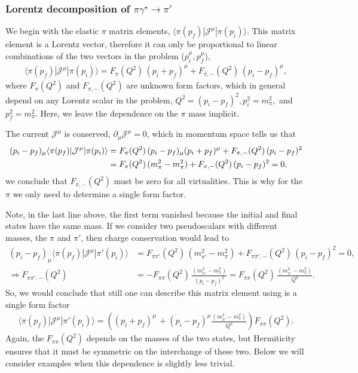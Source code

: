 \subsubsection{Lorentz decomposition of $\pi\gamma^\star\to\pi'$}
We begin with the elastic $\pi$ matrix elements, $\langle\pi(p_f)|{\mathcal{J}}^{\mu}|\pi(p_i)\rangle$. This matrix element is a Lorentz vector, therefore it can only be proportional to linear combinations of the two vectors in the problem ($p_i^\mu, p_f^\mu$),
\begin{align}
\langle\pi(p_f)|{\mathcal{J}}^{\mu}|\pi(p_i)\rangle=F_\pi(Q^2)\,(p_i+p_f)^\mu+F_{\pi,-}(Q^2)\,(p_i-p_f)^\mu,
\end{align}
where $F_\pi(Q^2)$ and $F_{\pi,-}(Q^2)$ are unknown form factors, which in general depend on any Lorentz scalar in the problem, $Q^2=(p_i-p_f)^2, p_i^2=m_\pi^2,$ and $p_f^2=m_\pi^2$. Here, we leave the dependence on the $\pi$ mass implicit. 

The current ${\mathcal{J}}^{\mu}$ is conserved, $\partial_\mu {\mathcal{J}}^{\mu}=0$, which in momentum space tells us that 
\begin{align}
(p_i-p_f)_\mu\langle\pi(p_f)|{\mathcal{J}}^{\mu}|\pi(p_i)\rangle&=F_\pi(Q^2)\, (p_i-p_f)_\mu(p_i+p_f)^\mu+F_{\pi,-}(Q^2)\,(p_i-p_f)^2
\nonumber\\
&=
F_\pi(Q^2)\, (m_\pi^2-m_\pi^2)
+
F_{\pi,-}(Q^2)\,(p_i-p_f)^2
=0,
\end{align}
we conclude that $F_{\pi,-}(Q^2)$ must be zero for all virtualities. This is why for the $\pi$ we only need to determine a single form factor. 

Note, in the last line above, the first term vanished because the initial and final states have the same mass. If we consider two pseudoscalars with different masses, the $\pi$ and $\pi'$, then charge conservation would lead to
\begin{align}
(p_i-p_f)_\mu\langle\pi(p_f)|{\mathcal{J}}^{\mu}|\pi'(p_i)\rangle&=
F_{\pi\pi'}(Q^2)\, (m_{\pi'}^2-m_\pi^2)
+
F_{\pi\pi',-}(Q^2)\,(p_i-p_f)^2
=0,
\\
\Rightarrow
F_{\pi\pi',-}(Q^2)
&=-
F_{\pi\pi}(Q^2)\, \frac{(m_{\pi'}^2-m_\pi^2)}{(p_i-p_f)^2}
= 
F_{\pi\pi}(Q^2)\, \frac{(m_{\pi'}^2-m_\pi^2)}{Q^2}.
\end{align} 
So, we would conclude that still one can describe this matrix element using is a single form factor
\begin{align}
\langle\pi(p_f)|{\mathcal{J}}^{\mu}|\pi'(p_i)\rangle=
\left( (p_i+p_f)^\mu \, +(p_i-p_f)^\mu\frac{(m_{\pi'}^2-m_\pi^2)}{Q^2}\right)F_{\pi\pi}(Q^2).
\label{eq:pi_to_pi_FF}
\end{align}
Again, the $F_{\pi\pi}(Q^2)$ depends on the masses of the two states, but Hermiticity ensures that it must be symmetric on the interchange of these two. Below we will consider examples when this dependence is slightly less trivial.  


